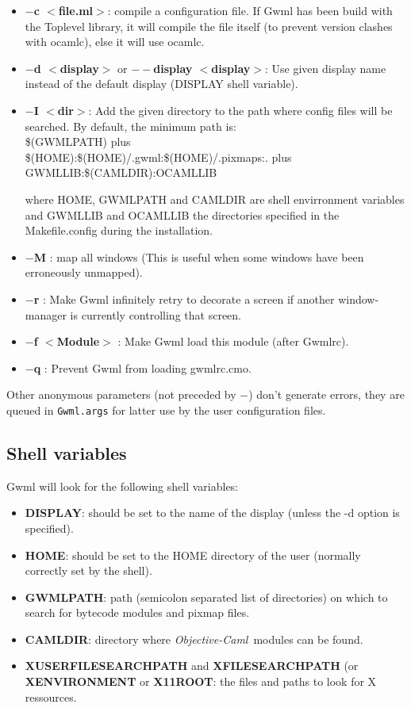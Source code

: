\documentclass{book}
\newcommand{\ocaml}{\emph{Objective-Caml}}
\begin{document}
\begin{itemize}
 \item {\bf $-$c $<$file.ml$>$}: compile a configuration file. If Gwml has 
been build with the Toplevel library, it will compile the file itself (to 
prevent version clashes with ocamlc), else it will use ocamlc.

 \item {\bf $-$d  $<$display$>$} or {\bf $--$display  $<$display$>$}:
    Use given display name instead of the default display (DISPLAY shell variable).
 \item {\bf $-$I  $<$dir$>$}: Add the given directory to the path where
    config files will be searched. By default, the minimum path is:\\
    \$(GWMLPATH)  plus\\
    \$(HOME):\$(HOME)/.gwml:\$(HOME)/.pixmaps:.    plus\\
    GWMLLIB:\$(CAMLDIR):OCAMLLIB

   where HOME, GWMLPATH and CAMLDIR are shell envirronment variables and
   GWMLLIB and OCAMLLIB the directories specified in the Makefile.config
   during the installation.

 \item {\bf $-$M} : map all windows (This is useful when some windows have been
    erroneously unmapped).

 \item {\bf $-$r} : Make Gwml infinitely retry to decorate a screen if  
    another window-manager is currently controlling that screen.

 \item {\bf $-$f $<$Module$>$} : Make Gwml load this module (after Gwmlrc).
 \item {\bf $-$q} : Prevent Gwml from loading gwmlrc.cmo.
\end{itemize}

  Other anonymous parameters (not preceded by $-$) don't generate errors,
they are queued in {\tt Gwml.args} for latter use by the user configuration
files.

\subsection{Shell variables}

  Gwml will look for the following shell variables:
\begin{itemize}
\item {\bf DISPLAY}: should be set to the name of the display (unless the -d 
option is specified).
\item {\bf HOME}: should be set to the HOME directory of the user (normally 
correctly set by the shell).
\item {\bf GWMLPATH}: path (semicolon separated list of directories) on which
to search for bytecode modules and pixmap files.
\item {\bf CAMLDIR}: directory where \ocaml~modules can be found.
\item {\bf XUSERFILESEARCHPATH} and {\bf XFILESEARCHPATH} (or {\bf 
XENVIRONMENT} or {\bf X11ROOT}: the files and paths to look for X ressources.
\end{itemize}
\end{document}
